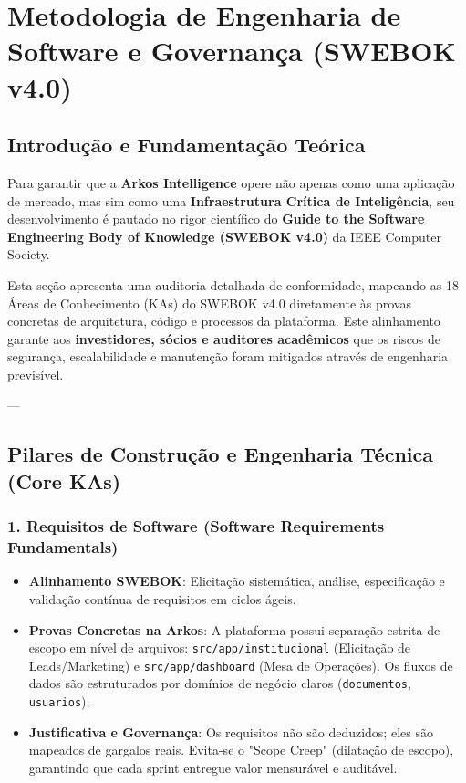 \pagebreak
\chapter{Metodologia de Engenharia de Software e Governança (SWEBOK v4.0)}

\section{Introdução e Fundamentação Teórica}
Para garantir que a \textbf{Arkos Intelligence} opere não apenas como uma aplicação de mercado, mas sim como uma \textbf{Infraestrutura Crítica de Inteligência}, seu desenvolvimento é pautado no rigor científico do \textbf{Guide to the Software Engineering Body of Knowledge (SWEBOK v4.0)} da IEEE Computer Society. 

Esta seção apresenta uma auditoria detalhada de conformidade, mapeando as 18 Áreas de Conhecimento (KAs) do SWEBOK v4.0 diretamente às provas concretas de arquitetura, código e processos da plataforma. Este alinhamento garante aos \textbf{investidores, sócios e auditores acadêmicos} que os riscos de segurança, escalabilidade e manutenção foram mitigados através de engenharia previsível.

---

\section{Pilares de Construção e Engenharia Técnica (Core KAs)}

\subsection{1. Requisitos de Software (Software Requirements Fundamentals)}
\begin{itemize}
    \item \textbf{Alinhamento SWEBOK}: Elicitação sistemática, análise, especificação e validação contínua de requisitos em ciclos ágeis.
    \item \textbf{Provas Concretas na Arkos}: A plataforma possui separação estrita de escopo em nível de arquivos: \texttt{src/app/institucional} (Elicitação de Leads/Marketing) e \texttt{src/app/dashboard} (Mesa de Operações). Os fluxos de dados são estruturados por domínios de negócio claros (\texttt{documentos}, \texttt{usuarios}).
    \item \textbf{Justificativa e Governança}: Os requisitos não são deduzidos; eles são mapeados de gargalos reais. Evita-se o "Scope Creep" (dilatação de escopo), garantindo que cada sprint entregue valor mensurável e auditável.
\end{itemize}

